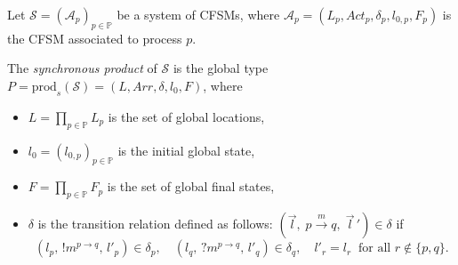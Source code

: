 \begin{definition}\label{def:syncprod}
Let $\mathcal{S} = (\mathcal{A}_p)_{p \in \mathbb{P}}$ be a system of CFSMs, where 
$\mathcal{A}_p = (L_p, \mathit{Act}_p, \delta_p, l_{0,p}, F_p)$ is the CFSM associated 
to process $p$.  

The \emph{synchronous product} of $\mathcal{S}$ is the global type 
$P = \mathrm{prod}_s(\mathcal{S}) = (L, \mathit{Arr}, \delta, l_0, F)$,
where
\begin{itemize}
    \item $L = \prod_{p \in \mathbb{P}} L_p$ is the set of global locations,
    \item $l_0 = (l_{0,p})_{p \in \mathbb{P}}$ is the initial global state,
    \item $F = \prod_{p \in \mathbb{P}} F_p$ is the set of global final states,
    \item $\delta$ is the transition relation defined as follows:  
    $(\vec{l}, \; p \xrightarrow{m} q, \; \vec{l}\,') \in \delta$ if
    \[
    (l_p,\, !m^{p \to q},\, l'_p) \in \delta_p, \quad 
    (l_q,\, ?m^{p \to q},\, l'_q) \in \delta_q, \quad 
    l'_r = l_r \;\; \text{for all } r \notin \{p,q\}.
    \]
\end{itemize}
\end{definition}

\bigskip

